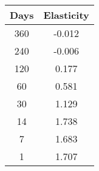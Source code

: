 \begin{tabular}{||c c||}
\hline
Days & Elasticity \\
\hline\hline
360 & -0.012 \\
240 & -0.006 \\
120 & 0.177 \\
60 & 0.581 \\
30 & 1.129 \\
14 & 1.738 \\
7 & 1.683 \\
1 & 1.707 \\
\hline
\end{tabular}
